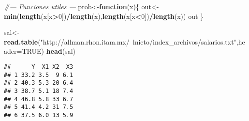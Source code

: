 \documentclass[]{article}
\newenvironment{Shaded}{\begin{snugshade}}{\end{snugshade}}
\newcommand{\KeywordTok}[1]{\textcolor[rgb]{0.13,0.29,0.53}{\textbf{#1}}}
\newcommand{\DataTypeTok}[1]{\textcolor[rgb]{0.13,0.29,0.53}{#1}}
\newcommand{\DecValTok}[1]{\textcolor[rgb]{0.00,0.00,0.81}{#1}}
\newcommand{\StringTok}[1]{\textcolor[rgb]{0.31,0.60,0.02}{#1}}
\newcommand{\CommentTok}[1]{\textcolor[rgb]{0.56,0.35,0.01}{\textit{#1}}}
\newcommand{\OtherTok}[1]{\textcolor[rgb]{0.56,0.35,0.01}{#1}}
\newcommand{\ControlFlowTok}[1]{\textcolor[rgb]{0.13,0.29,0.53}{\textbf{#1}}}
\newcommand{\OperatorTok}[1]{\textcolor[rgb]{0.81,0.36,0.00}{\textbf{#1}}}
\newcommand{\NormalTok}[1]{#1}
\begin{document}
\begin{Shaded}
\begin{Highlighting}[]
\CommentTok{#--- Funciones utiles ---}
\NormalTok{prob<-}\ControlFlowTok{function}\NormalTok{(x)\{}
\NormalTok{  out<-}\KeywordTok{min}\NormalTok{(}\KeywordTok{length}\NormalTok{(x[x}\OperatorTok{>}\DecValTok{0}\NormalTok{])}\OperatorTok{/}\KeywordTok{length}\NormalTok{(x),}\KeywordTok{length}\NormalTok{(x[x}\OperatorTok{<}\DecValTok{0}\NormalTok{])}\OperatorTok{/}\KeywordTok{length}\NormalTok{(x))}
\NormalTok{  out}
\NormalTok{\}}
\end{Highlighting}
\end{Shaded}

\begin{Shaded}
\begin{Highlighting}[]
\NormalTok{sal<-}\KeywordTok{read.table}\NormalTok{(}\StringTok{"http://allman.rhon.itam.mx/~lnieto/index_archivos/salarios.txt"}\NormalTok{,}\DataTypeTok{header=}\OtherTok{TRUE}\NormalTok{)}
\KeywordTok{head}\NormalTok{(sal)}
\end{Highlighting}
\end{Shaded}

\begin{verbatim}
##      Y  X1 X2  X3
## 1 33.2 3.5  9 6.1
## 2 40.3 5.3 20 6.4
## 3 38.7 5.1 18 7.4
## 4 46.8 5.8 33 6.7
## 5 41.4 4.2 31 7.5
## 6 37.5 6.0 13 5.9
\end{verbatim}
\end{document}
